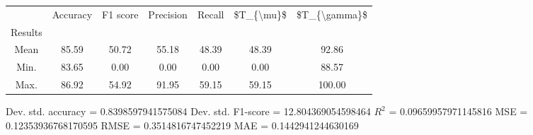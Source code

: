 \begin{tabular}{|c|c|c|c|c|c|c|}
\toprule
{} &  Accuracy &  F1 score &  Precision &  Recall &  \$T\_\{\textbackslash mu\}\$ &  \$T\_\{\textbackslash gamma\}\$ \\
Results &           &           &            &         &            &               \\
\hline
Mean    &     85.59 &     50.72 &      55.18 &   48.39 &      48.39 &         92.86 \\
Min.    &     83.65 &      0.00 &       0.00 &    0.00 &       0.00 &         88.57 \\
Max.    &     86.92 &     54.92 &      91.95 &   59.15 &      59.15 &        100.00 \\
\bottomrule
\end{tabular}

 Dev. std. accuracy = 0.8398597941575084
 Dev. std. F1-score = 12.804369054598464
 $R^2$ = 0.09659957971145816
 MSE = 0.12353936768170595
 RMSE = 0.3514816747452219
 MAE = 0.1442941244630169